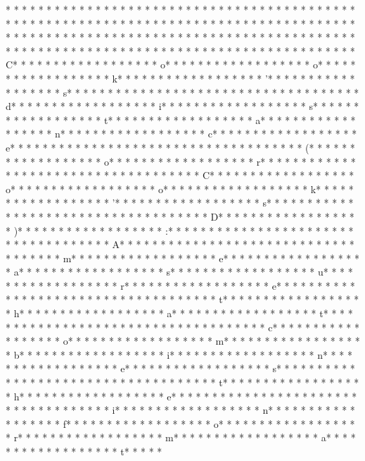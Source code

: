 * * *  * * *  * * *  *  * * *  *  * * *  * * *  * * *  *  * * *  *  * * *  * * *  * * *  *  * * *  *  * * *  *  * * *  * * *  * * *  *  * * *  *  * * *  *  * * *  * * *  * * *  *  * * *  *  * * *  *  * * *  * * *  * * *  *  * * *  *  * * *  *  * * *  * * *  * * *  *  * * *  *  * * *  *  * * *  * * *  * * *  *  * * *  *  * * *  *  * * *  * * *  * * *  *  * * *  *  * * *  *  * * *  * * *  * * *  *  * * *  *  * * *  * C* * *  * * *  * * *  *  * * *  *  * * *  * o* * *  * * *  * * *  *  * * *  *  * * *  * o* * *  * * *  * * *  *  * * *  *  * * *  * k* * *  * * *  * * *  *  * * *  *  * * *  * '* * *  * * *  * * *  *  * * *  *  * * *  * s* * *  * * *  * * *  *  * * *  *  * * *  *  * * *  * * *  * * *  *  * * *  *  * * *  * d* * *  * * *  * * *  *  * * *  *  * * *  * i* * *  * * *  * * *  *  * * *  *  * * *  * s* * *  * * *  * * *  *  * * *  *  * * *  * t* * *  * * *  * * *  *  * * *  *  * * *  * a* * *  * * *  * * *  *  * * *  *  * * *  * n* * *  * * *  * * *  *  * * *  *  * * *  * c* * *  * * *  * * *  *  * * *  *  * * *  * e* * *  * * *  * * *  *  * * *  *  * * *  *  * * *  * * *  * * *  *  * * *  *  * * *  * (* * *  * * *  * * *  *  * * *  *  * * *  * o* * *  * * *  * * *  *  * * *  *  * * *  * r* * *  * * *  * * *  *  * * *  *  * * *  *  * * *  * * *  * * *  *  * * *  *  * * *  * C* * *  * * *  * * *  *  * * *  *  * * *  * o* * *  * * *  * * *  *  * * *  *  * * *  * o* * *  * * *  * * *  *  * * *  *  * * *  * k* * *  * * *  * * *  *  * * *  *  * * *  * '* * *  * * *  * * *  *  * * *  *  * * *  * s* * *  * * *  * * *  *  * * *  *  * * *  *  * * *  * * *  * * *  *  * * *  *  * * *  * D* * *  * * *  * * *  *  * * *  *  * * *  * )* * *  * * *  * * *  *  * * *  *  * * *  * :* * *  * * *  * * *  *  * * *  *  * * *  *  * * *  * * *  * * *  *  * * *  *  * * *  * A* * *  * * *  * * *  *  * * *  *  * * *  *  * * *  * * *  * * *  *  * * *  *  * * *  * m* * *  * * *  * * *  *  * * *  *  * * *  * e* * *  * * *  * * *  *  * * *  *  * * *  * a* * *  * * *  * * *  *  * * *  *  * * *  * s* * *  * * *  * * *  *  * * *  *  * * *  * u* * *  * * *  * * *  *  * * *  *  * * *  * r* * *  * * *  * * *  *  * * *  *  * * *  * e* * *  * * *  * * *  *  * * *  *  * * *  *  * * *  * * *  * * *  *  * * *  *  * * *  * t* * *  * * *  * * *  *  * * *  *  * * *  * h* * *  * * *  * * *  *  * * *  *  * * *  * a* * *  * * *  * * *  *  * * *  *  * * *  * t* * *  * * *  * * *  *  * * *  *  * * *  *  * * *  * * *  * * *  *  * * *  *  * * *  * c* * *  * * *  * * *  *  * * *  *  * * *  * o* * *  * * *  * * *  *  * * *  *  * * *  * m* * *  * * *  * * *  *  * * *  *  * * *  * b* * *  * * *  * * *  *  * * *  *  * * *  * i* * *  * * *  * * *  *  * * *  *  * * *  * n* * *  * * *  * * *  *  * * *  *  * * *  * e* * *  * * *  * * *  *  * * *  *  * * *  * s* * *  * * *  * * *  *  * * *  *  * * *  *  * * *  * * *  * * *  *  * * *  *  * * *  * t* * *  * * *  * * *  *  * * *  *  * * *  * h* * *  * * *  * * *  *  * * *  *  * * *  * e* * *  * * *  * * *  *  * * *  *  * * *  *  * * *  * * *  * * *  *  * * *  *  * * *  * i* * *  * * *  * * *  *  * * *  *  * * *  * n* * *  * * *  * * *  *  * * *  *  * * *  * f* * *  * * *  * * *  *  * * *  *  * * *  * o* * *  * * *  * * *  *  * * *  *  * * *  * r* * *  * * *  * * *  *  * * *  *  * * *  * m* * *  * * *  * * *  *  * * *  *  * * *  * a* * *  * * *  * * *  *  * * *  *  * * *  * t* * *  * * 